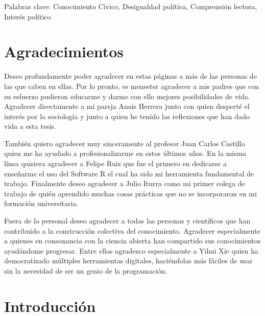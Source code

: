 \documentclass[12pt,twoside]{templates/facsothesis}
\begin{document}
Palabras clave: Conocimiento Cívico, Desigualdad política, Comprensión lectora, Interés político

\hypertarget{agradecimientos}{%
\chapter*{Agradecimientos}\label{agradecimientos}}

Deseo profundamente poder agradecer en estas páginas a más de las personas de las que caben en ellas. Por lo pronto, es menester agradecer a mis padres que con su esfuerzo pudieron educarme y darme con ello mejores posibilidades de vida.
Agradecer directamente a mi pareja Anais Herrera junto con quien desperté el interés por la sociología y junto a quien he tenido las reflexiones que han dado vida a esta tesis.

También quiero agradecer muy sinceramente al profesor Juan Carlos Castillo quien me ha ayudado a profesionalizarme en estos últimos años. En la misma línea quisiera agradecer a Felipe Ruiz que fue el primero en dedicarse a enseñarme el uso del Software R el cual ha sido mi herramienta fundamental de trabajo. Finalmente deseo agradecer a Julio Iturra como mi primer colega de trabajo de quién aprendido muchas cosas prácticas que no se incorporaron en mi formación universitaria.

Fuera de lo personal deseo agradecer a todas las personas y científicos que han contribuido a la construcción colectiva del conocimiento. Agradecer especialmente a quienes en consonancia con la ciencia abierta han compartido sus conocimientos ayudándome progresar. Entre ellos agradezco especialmente a Yihui Xie quien ha democratizado múltiples herramientas digitales, haciéndolas más fáciles de usar sin la necesidad de ser un genio de la programación.

\hypertarget{introducciuxf3n}{%
\chapter{Introducción}\label{introducciuxf3n}}
\end{document}
